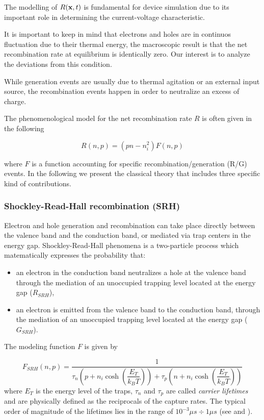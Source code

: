 The modelling of $R(\mathbf{x},t)$ is fundamental for device simulation due to its important role in determining the current-voltage characteristic.
 
It is important to keep in mind that electrons and holes are in continuos fluctuation due to their thermal energy, the macroscopic result is that the net recombination rate at equilibrium  is identically zero. Our interest is to analyze the deviations from this condition. 

While generation events are usually due to thermal agitation or an external input source, the recombination events happen in order to neutralize an excess of charge.

The phenomenological model for the net recombination rate $R$ is often given in the following

\begin{equation}
\label{eq: generic RG}
R(n,p) = (pn-n_i^2)F(n,p)
\end{equation}

where $F$ is a function accounting for specific recombination/generation (R/G) events.
In the following we present the classical theory that includes three specific kind of contributions. 

\subsubsection{Shockley-Read-Hall recombination (SRH)}

Electron and hole generation and recombination can take place directly between the valence band and the conduction band, or mediated via trap centers in the energy gap. Shockley-Read-Hall phenomena is a two-particle process which matematically expresses the probability that:
\begin{itemize}
\item an electron in the conduction band neutralizes a hole at the valence band through the mediation of an unoccupied trapping level located at the energy gap ($R_{SRH}$),
\item an electron is emitted from the valence band to the conduction band, through the mediation of an unoccupied trapping level located at the energy gap ($G_{SRH}$).
\end{itemize}

The modeling function $F$ is given by

\begin{equation}
F_{SRH}(n,p) = \dfrac{1}{\tau_n\left(p+n_i \cosh\left(\dfrac{E_T}{k_BT} \right) \right)+\tau_p\left(n+n_i \cosh\left(\dfrac{E_T}{k_BT}\right) \right)}
\end{equation}
where $E_T$ is the energy level of the traps, $\tau_n$ and $\tau_p$ are called \textit{carrier lifetimes} and are physically defined as the reciprocals of the capture rates. The typical order of magnitude of the lifetimes lies in the range of $10^{-3}\mu s\div 1 \mu s$ (see  \cite{VanOver:SRH} and \cite{Goebel:SRH}). 

